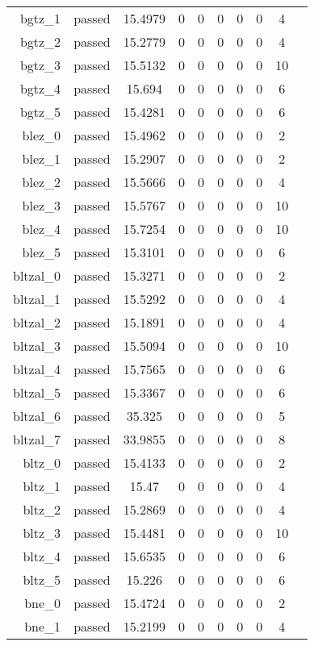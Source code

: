 \begin{longtable}{r|ccccccccc}
    bgtz\_1 & passed & 15.4979 & 0 & 0 & 0 & 0 & 0 & 4 \\
    bgtz\_2 & passed & 15.2779 & 0 & 0 & 0 & 0 & 0 & 4 \\
    bgtz\_3 & passed & 15.5132 & 0 & 0 & 0 & 0 & 0 & 10 \\
    bgtz\_4 & passed & 15.694 & 0 & 0 & 0 & 0 & 0 & 6 \\
    bgtz\_5 & passed & 15.4281 & 0 & 0 & 0 & 0 & 0 & 6 \\
    blez\_0 & passed & 15.4962 & 0 & 0 & 0 & 0 & 0 & 2 \\
    blez\_1 & passed & 15.2907 & 0 & 0 & 0 & 0 & 0 & 2 \\
    blez\_2 & passed & 15.5666 & 0 & 0 & 0 & 0 & 0 & 4 \\
    blez\_3 & passed & 15.5767 & 0 & 0 & 0 & 0 & 0 & 10 \\
    blez\_4 & passed & 15.7254 & 0 & 0 & 0 & 0 & 0 & 10 \\
    blez\_5 & passed & 15.3101 & 0 & 0 & 0 & 0 & 0 & 6 \\
    bltzal\_0 & passed & 15.3271 & 0 & 0 & 0 & 0 & 0 & 2 \\
    bltzal\_1 & passed & 15.5292 & 0 & 0 & 0 & 0 & 0 & 4 \\
    bltzal\_2 & passed & 15.1891 & 0 & 0 & 0 & 0 & 0 & 4 \\
    bltzal\_3 & passed & 15.5094 & 0 & 0 & 0 & 0 & 0 & 10 \\
    bltzal\_4 & passed & 15.7565 & 0 & 0 & 0 & 0 & 0 & 6 \\
    bltzal\_5 & passed & 15.3367 & 0 & 0 & 0 & 0 & 0 & 6 \\
    bltzal\_6 & passed & 35.325 & 0 & 0 & 0 & 0 & 0 & 5 \\
    bltzal\_7 & passed & 33.9855 & 0 & 0 & 0 & 0 & 0 & 8 \\
    bltz\_0 & passed & 15.4133 & 0 & 0 & 0 & 0 & 0 & 2 \\
    bltz\_1 & passed & 15.47 & 0 & 0 & 0 & 0 & 0 & 4 \\
    bltz\_2 & passed & 15.2869 & 0 & 0 & 0 & 0 & 0 & 4 \\
    bltz\_3 & passed & 15.4481 & 0 & 0 & 0 & 0 & 0 & 10 \\
    bltz\_4 & passed & 15.6535 & 0 & 0 & 0 & 0 & 0 & 6 \\
    bltz\_5 & passed & 15.226 & 0 & 0 & 0 & 0 & 0 & 6 \\
    bne\_0 & passed & 15.4724 & 0 & 0 & 0 & 0 & 0 & 2 \\
    bne\_1 & passed & 15.2199 & 0 & 0 & 0 & 0 & 0 & 4 \\

\end{longtable}
